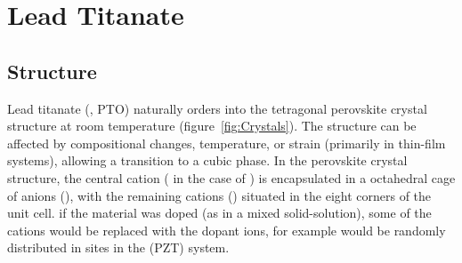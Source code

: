 \chapter{Lead Titanate}
\label{chap:Materials}
\thispagestyle{empty}



\section{Structure}
\label{sec:Materials-Struct}

Lead titanate (\PTO{}, PTO) naturally orders into the tetragonal perovskite crystal structure at room temperature (figure~\vref{fig:Crystals}). The structure can be affected by compositional changes, temperature, or strain (primarily in thin-film systems), allowing a transition to a cubic phase. In the perovskite crystal structure, the central cation (\TiIon{} in the case of \PTO{}) is encapsulated in a octahedral cage of anions (\OIon{}), with the remaining cations (\PbIon{}) situated in the eight corners of the unit cell. if the material was doped (as in a mixed solid-solution), some of the cations would be replaced with the dopant ions, for example \ZrIon{} would be randomly distributed in  \TiIon{} sites in the \PZT{} (PZT) system. 


